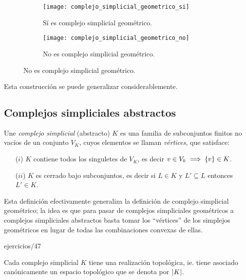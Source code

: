 \documentclass[../../topologia_algebraica]{subfiles}
\begin{document}
\begin{figure}[ht] %
  \centering
  \begin{subfigure}{0.48\textwidth}\caption{S\'i es complejo simplicial geom\'etrico.}
    \texttt{[image: complejo\_simplicial\_geometrico\_si]}    
  \end{subfigure}
  \begin{subfigure}{0.48\textwidth}\caption{No es complejo simplicial geom\'etrico.}
    \texttt{[image: complejo\_simplicial\_geometrico\_no]}    
  \end{subfigure}
\end{figure}%

Esta construcci\'on se puede generalizar considerablemente.

\subsection{Complejos simpliciales abstractos}

\begin{defin}
  Une \emph{complejo simplicial} (abstracto) $K$ es una familia de subconjuntos finitos no vac\'ios
  de un conjunto $V_K$, cuyos elementos se llaman \emph{v\'ertices}, que satisface:
  \begin{enumerate}
    \item[($i$)] $K$ contiene todos los singuletes de $V_K$, es decir $v\in V_k\;\Longrightarrow\; \{v\}\in K$.
    \item[($ii$)] $K$ es cerrado bajo subconjuntos, es decir si $L\in K$ y $L'\subseteq L$ entonces
      $L'\in K$.
  \end{enumerate}
\end{defin}

Esta definici\'on efectivamente generaliza la definici\'on de complejo simplicial geom\'etrico; la
idea es que para pasar de complejos simpliciales geom\'etricos a complejos simpliciales abstractos
basta tomar los ``v\'ertices'' de los simplejos geom\'etricos en lugar de todas las combinaciones
convexas de ellas.

{ejercicios/47} %

Cada complejo simplicial $K$ tiene una realizaci\'on topol\'ogica, ie. tiene asociado can\'onicamente
un espacio topol\'ogico que se denota por $\left| K \right|$.
\end{document}
